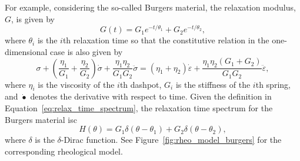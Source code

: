 For example, considering the so-called Burgers material, the relaxation modulus, $G$, is given by \citep{malkinRheologyConceptsMethods2017}
\begin{equation}
\label{eq:relaxation_modulus_burgers}
  G(t)=G_{1} e^{-t / \theta_{1}} + G_2 e^{-t/\theta_2},
\end{equation}
where $\theta_i$ is the $i$th relaxation time so that the constitutive relation in the one-dimensional case is also given by
\begin{equation}
  \sigma + \left(\frac{\eta_1}{G_1} + \frac{\eta_2}{G_2}\right) \dot \sigma + \frac{\eta_1\eta_2}{G_1G_2}\ddot \sigma = (\eta_1 + \eta_2)\dot\varepsilon + \frac{\eta_1\eta_2(G_1 + G_2)}{G_1G_2}\ddot\varepsilon,
\end{equation}
where $\eta_i$ is the viscosity of the $i$th dashpot, $G_i$ is the stiffness of the $i$th spring, and $\dot{\bullet}$ denotes the derivative with respect to time.
Given the definition in Equation~\eqref{eq:relax_time_spectrum}, the relaxation time spectrum for the Burgers material isc
\begin{equation}
  H(\theta) = G_1 \delta(\theta - \theta_1) + G_2 \delta(\theta - \theta_2),
\end{equation}
where $\delta$ is the $\delta$-Dirac function.
See Figure~\ref{fig:rheo_model_burgers} for the corresponding rheological model.

